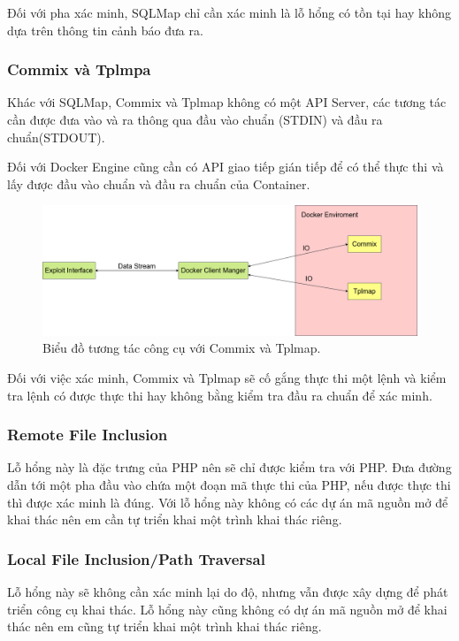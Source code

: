 \documentclass[./../main.tex]{subfiles}
\begin{document}
Đối với pha xác minh, SQLMap chỉ cần xác minh là lỗ hổng có tồn tại hay không dựa trên thông tin cảnh báo đưa ra.
\subsubsection{Commix và Tplmpa}
Khác với SQLMap, Commix và Tplmap không có một API Server, các tương tác cần được đưa vào và ra thông qua đầu vào chuẩn (STDIN) và đầu ra chuẩn(STDOUT).

Đối với Docker Engine cũng cần có API giao tiếp gián tiếp để có thể thực thi và lấy được đầu vào chuẩn và đầu ra chuẩn của Container.


\begin{figure}[H]
	\includegraphics[width=\linewidth]{./images/DockerIO.png}
	\caption{Biểu đồ tương tác công cụ với Commix và Tplmap.}
	\label{fig:commix_tplmap}
\end{figure}

Đối với việc xác minh, Commix và Tplmap sẽ cố gắng thực thi một lệnh và kiểm tra lệnh có được thực thi hay không bằng kiểm tra đầu ra chuẩn để xác minh.

\subsubsection{Remote File Inclusion}
Lỗ hổng này là đặc trưng của PHP nên sẽ chỉ được kiểm tra với PHP. Đưa đường dẫn tới một pha đầu vào chứa một đoạn mã thực thi của PHP, nếu được thực thi thì được xác minh là đúng. Với lỗ hổng này không có các dự án mã nguồn mở để khai thác nên em cần tự triển khai một trình khai thác riêng.
\subsubsection{Local File Inclusion/Path Traversal}
Lỗ hổng này sẽ không cần xác minh lại do độ, nhưng vẫn được xây dựng để phát triển công cụ khai thác. Lỗ hổng này cũng không có dự án mã nguồn mở để khai thác nên em cũng tự triển khai một trình khai thác riêng.
\end{document}
